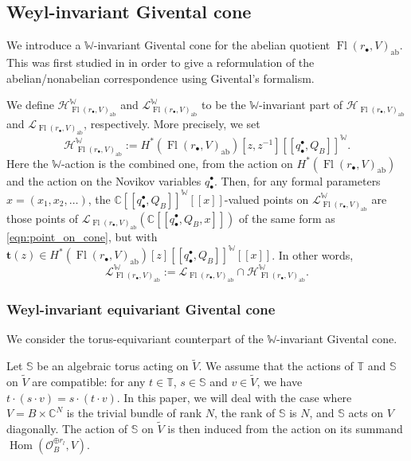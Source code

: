 \documentclass[a4paper,12pt]{amsart}
\numberwithin{equation}{section}
\theoremstyle{definition}
\newcommand{\C}{\mathbb{C}}
\newcommand{\bbS}{\mathbb{S}}
\newcommand{\T}{\mathbb{T}}
\newcommand{\W}{\mathbb{W}}
\newcommand{\bt}{\mathbf{t}}
\newcommand{\cH}{\mathcal{H}}
\newcommand{\cL}{\mathcal{L}}
\newcommand{\Fl}{\operatorname{Fl}}
\newcommand{\Hom}{\operatorname{Hom}}
\begin{document}
\subsection{Weyl-invariant Givental cone}\label{subsec:Weyl_invariant_cone_abelian_quotient}
We introduce a $\W$-invariant Givental cone for the abelian quotient $\Fl(r_\bullet,V)_{\operatorname{ab}}$.
This was first studied in \cite{CLS} in order to give a reformulation of the abelian/nonabelian correspondence using Givental's formalism.

We define $\cH_{\Fl(r_\bullet,V)_{\operatorname{ab}}}^\W$ and $\cL_{\Fl(r_\bullet,V)_{\operatorname{ab}}}^\W$ to be the $\W$-invariant part of $\cH_{\Fl(r_\bullet,V)_{\operatorname{ab}}}$ and $\cL_{\Fl(r_\bullet,V)_{\operatorname{ab}}}$, respectively.
More precisely, we set 
\[
\cH_{\Fl(r_\bullet,V)_{\operatorname{ab}}}^\W:=H^*(\Fl(r_\bullet,V)_{\operatorname{ab}})[z,z^{-1}][\![q_\bullet^\bullet,Q_B]\!]^\W.
\]
Here the $\W$-action is the combined one, from the action on $H^*(\Fl(r_\bullet,V)_{\operatorname{ab}})$ and the action on the Novikov variables $q_\bullet^\bullet$. Then, for any formal parameters $x=(x_1,x_2,\dots)$, the $\C[\![q_\bullet^\bullet,Q_B]\!]^\W[\![x]\!]$-valued points on $\cL_{\Fl(r_\bullet,V)_{\operatorname{ab}}}^\W$ are those points of $\cL_{\Fl(r_\bullet,V)_{\operatorname{ab}}}(\C[\![q_\bullet^\bullet,Q_B,x]\!])$ of the same form as \eqref{eqn:point_on_cone}, but with $\bt(z)\in H^*(\Fl(r_\bullet,V)_{\operatorname{ab}})[z][\![q_\bullet^\bullet,Q_B]\!]^\W[\![x]\!]$.
In other words, 
\[
\cL_{\Fl(r_\bullet,V)_{\operatorname{ab}}}^\W := \cL_{\Fl(r_\bullet,V)_{\operatorname{ab}}} \cap \cH_{\Fl(r_\bullet,V)_{\operatorname{ab}}}^\W.
\]


\subsubsection{Weyl-invariant equivariant Givental cone}
We consider the torus-equivariant counterpart of the $\W$-invariant Givental cone.

Let $\bbS$ be an algebraic torus acting on $\widetilde{V}$.
We assume that the actions of $\T$ and $\bbS$ on $\widetilde{V}$ are compatible: for any $t\in\T$, $s\in\bbS$ and $v\in\widetilde{V}$, we have $t\cdot(s\cdot v) = s\cdot(t\cdot v)$.
In this paper, we will deal with the case where $V=B\times\C^N$ is the trivial bundle of rank $N$, the rank of $\bbS$ is $N$, and $\bbS$ acts on $V$ diagonally. The action of $\bbS$ on $\widetilde{V}$ is then induced from the action on its summand $\Hom(\mathcal{O}_B^{\oplus r_l},V)$.
\end{document}
